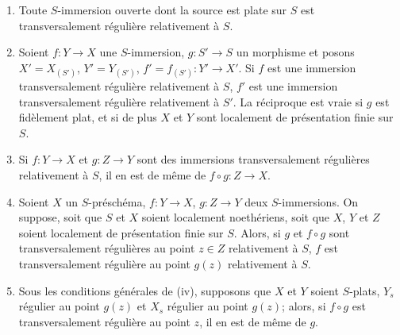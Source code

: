 \begin{proposition}[19.2.7]
\label{IV.19.2.7}
\begin{enumerate}
  \item[\textup{(i)}] Toute $S$-immersion ouverte dont la source est plate sur $S$ est transversalement régulière relativement à $S$.
  \item[\textup{(ii)}] Soient $f:Y\to X$ une $S$-immersion, $g:S'\to S$ un morphisme et posons $X'=X_{(S')}$, $Y'=Y_{(S')}$, $f'=f_{(S')}:Y'\to X'$. Si $f$ est une immersion transversalement régulière relativement à $S$, $f'$ est une immersion transversalement régulière relativement à $S'$. La réciproque est vraie si $g$ est fidèlement plat, et si de plus $X$ et $Y$ sont localement de présentation finie sur $S$.
  \item[\textup{(iii)}] Si $f:Y\to X$ et $g:Z\to Y$ sont des immersions transversalement régulières relativement à $S$, il en est de même de $f\circ g:Z\to X$.
  \item[\textup{(iv)}] Soient $X$ un $S$-préschéma, $f:Y\to X$, $g:Z\to Y$ deux $S$-immersions. On suppose, soit que $S$ et $X$ soient localement noethériens, soit que $X$, $Y$ et $Z$ soient localement de présentation finie sur $S$. Alors, si $g$ et $f\circ g$ sont transversalement régulières au point $z\in Z$ relativement à $S$, $f$ est transversalement régulière au point $g(z)$ relativement à $S$.
  \item[\textup{(v)}] Sous les conditions générales de \textup{(iv)}, supposons que $X$ et $Y$ soient $S$-plats, $Y_s$ régulier au point $g(z)$ et $X_s$ régulier au point $g(z)$; alors, si $f\circ g$ est transversalement régulière au point $z$, il en est de même de $g$.
\end{enumerate}
\end{proposition}

